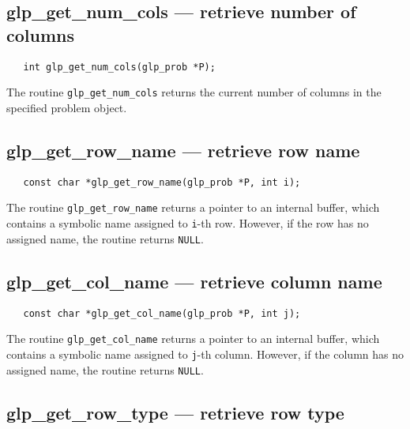 \newpage

\subsection{glp\_get\_num\_cols --- retrieve number of columns}

\synopsis

\begin{verbatim}
   int glp_get_num_cols(glp_prob *P);
\end{verbatim}

\returns

The routine \verb|glp_get_num_cols| returns the current number of
columns in the specified problem object.

\subsection{glp\_get\_row\_name --- retrieve row name}

\synopsis

\begin{verbatim}
   const char *glp_get_row_name(glp_prob *P, int i);
\end{verbatim}

\returns

The routine \verb|glp_get_row_name| returns a pointer to an internal
buffer, which contains a symbolic name assigned to \verb|i|-th row.
However, if the row has no assigned name, the routine returns
\verb|NULL|.

\subsection{glp\_get\_col\_name --- retrieve column name}

\synopsis

\begin{verbatim}
   const char *glp_get_col_name(glp_prob *P, int j);
\end{verbatim}

\returns

The routine \verb|glp_get_col_name| returns a pointer to an internal
buffer, which contains a symbolic name assigned to \verb|j|-th column.
However, if the column has no assigned name, the routine returns
\verb|NULL|.

\subsection{glp\_get\_row\_type --- retrieve row type}

